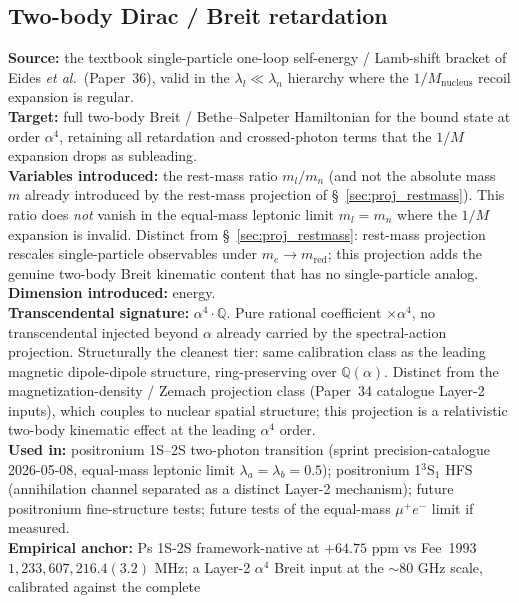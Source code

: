 \documentclass[11pt]{article}
\begin{document}
\subsection{Two-body Dirac / Breit retardation}
\label{sec:proj_breit_retardation}
\textbf{Source:} the textbook single-particle one-loop
self-energy / Lamb-shift bracket of Eides \emph{et al.}\ (Paper~36),
valid in the $\lambda_l \ll \lambda_n$ hierarchy where the
$1/M_\text{nucleus}$ recoil expansion is regular.\\
\textbf{Target:} full two-body Breit / Bethe--Salpeter Hamiltonian for
the bound state at order $\alpha^4$, retaining all retardation and
crossed-photon terms that the $1/M$ expansion drops as subleading.\\
\textbf{Variables introduced:} the rest-mass ratio $m_l/m_n$ (and not
the absolute mass~$m$ already introduced by the rest-mass projection
of \S~\ref{sec:proj_restmass}).  This ratio does \emph{not} vanish in
the equal-mass leptonic limit $m_l = m_n$ where the $1/M$ expansion
is invalid.  Distinct from \S~\ref{sec:proj_restmass}: rest-mass
projection rescales single-particle observables under
$m_e \to m_\text{red}$; this projection adds the genuine two-body
Breit kinematic content that has no single-particle analog.\\
\textbf{Dimension introduced:} energy.\\
\textbf{Transcendental signature:} $\alpha^4 \cdot \mathbb{Q}$.  Pure
rational coefficient $\times \alpha^4$, no transcendental injected
beyond $\alpha$ already carried by the spectral-action projection.
Structurally the cleanest tier: same calibration class as the leading
magnetic dipole-dipole structure, ring-preserving over
$\mathbb{Q}(\alpha)$.  Distinct from the magnetization-density /
Zemach projection class (Paper~34 catalogue Layer-2 inputs), which
couples to nuclear spatial structure; this projection is a relativistic
two-body kinematic effect at the leading $\alpha^4$ order.\\
\textbf{Used in:} positronium 1S--2S two-photon transition (sprint
precision-catalogue 2026-05-08, equal-mass leptonic limit
$\lambda_a = \lambda_b = 0.5$); positronium 1$^3$S$_1$ HFS (annihilation
channel separated as a distinct Layer-2 mechanism); future positronium
fine-structure tests; future tests of the equal-mass $\mu^+ e^-$
limit if measured.\\
\textbf{Empirical anchor:} Ps 1S-2S framework-native at $+64.75$ ppm
vs Fee~1993 $1{,}233{,}607{,}216.4(3.2)$ MHz; a Layer-2 $\alpha^4$
Breit input at the $\sim 80$ GHz scale, calibrated against the complete
\end{document}
